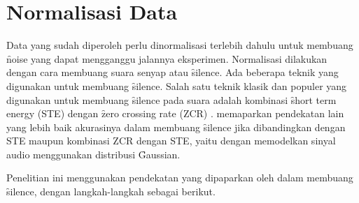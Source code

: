 \section{Normalisasi Data}
Data yang sudah diperoleh perlu dinormalisasi terlebih dahulu untuk membuang \f{noise} yang dapat mengganggu jalannya eksperimen. Normalisasi dilakukan dengan cara membuang suara senyap atau \f{silence}. Ada beberapa teknik yang digunakan untuk membuang \f{silence}. Salah satu teknik klasik dan populer yang digunakan untuk membuang \f{silence} pada suara adalah kombinasi \f{short term energy} (STE) dengan \f{zero crossing rate} (ZCR) \citep{rabiner1978digital}. \cite{saha2005new} memaparkan pendekatan lain yang lebih baik akurasinya dalam membuang \f{silence} jika dibandingkan dengan STE maupun kombinasi ZCR dengan STE, yaitu dengan memodelkan sinyal audio menggunakan distribusi \f{Gaussian}.

Penelitian ini menggunakan pendekatan yang dipaparkan oleh \cite{saha2005new} dalam membuang \f{silence}, dengan langkah-langkah sebagai berikut.

